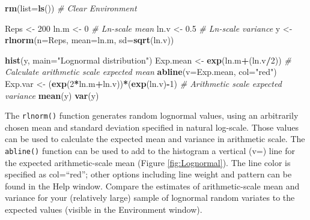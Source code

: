 \documentclass[
]{krantz}
\makeatletter
\newenvironment{Shaded}{\begin{snugshade}}{\end{snugshade}}
\newcommand{\AttributeTok}[1]{\textcolor[rgb]{0.27,0.27,0.27}{#1}}
\newcommand{\CommentTok}[1]{\textcolor[rgb]{0.37,0.37,0.37}{\textit{#1}}}
\newcommand{\DecValTok}[1]{\textcolor[rgb]{0.06,0.06,0.06}{#1}}
\newcommand{\FloatTok}[1]{\textcolor[rgb]{0.06,0.06,0.06}{#1}}
\newcommand{\FunctionTok}[1]{\textcolor[rgb]{0.27,0.27,0.27}{\textbf{#1}}}
\newcommand{\NormalTok}[1]{#1}
\newcommand{\OtherTok}[1]{\textcolor[rgb]{0.37,0.37,0.37}{#1}}
\newcommand{\SpecialCharTok}[1]{\textcolor[rgb]{0.43,0.43,0.43}{\textbf{#1}}}
\newcommand{\StringTok}[1]{\textcolor[rgb]{0.5,0.5,0.5}{#1}}
\newenvironment{kframe}{%
\medskip{}
\setlength{\fboxsep}{.8em}
 \def\at@end@of@kframe{}%
 \ifinner\ifhmode%
  \def\at@end@of@kframe{\end{minipage}}%
  \begin{minipage}{\columnwidth}%
 \fi\fi%
 \def\FrameCommand##1{\hskip\@totalleftmargin \hskip-\fboxsep
 \colorbox{shadecolor}{##1}\hskip-\fboxsep
     \hskip-\linewidth \hskip-\@totalleftmargin \hskip\columnwidth}%
 \MakeFramed {\advance\hsize-\width
   \@totalleftmargin\z@ \linewidth\hsize
   \@setminipage}}%
 {\par\unskip\endMakeFramed%
 \at@end@of@kframe}
\renewenvironment{Shaded}{\begin{kframe}}{\end{kframe}}
\makeatother
\begin{document}
\begin{Shaded}
\begin{Highlighting}[]
\FunctionTok{rm}\NormalTok{(}\AttributeTok{list=}\FunctionTok{ls}\NormalTok{()) }\CommentTok{\# Clear Environment}

\NormalTok{Reps }\OtherTok{\textless{}{-}} \DecValTok{200}
\NormalTok{ln.m }\OtherTok{\textless{}{-}} \DecValTok{0} \CommentTok{\# Ln{-}scale mean}
\NormalTok{ln.v }\OtherTok{\textless{}{-}} \FloatTok{0.5} \CommentTok{\# Ln{-}scale variance}
\NormalTok{y }\OtherTok{\textless{}{-}} \FunctionTok{rlnorm}\NormalTok{(}\AttributeTok{n=}\NormalTok{Reps, }\AttributeTok{mean=}\NormalTok{ln.m, }\AttributeTok{sd=}\FunctionTok{sqrt}\NormalTok{(ln.v))}

\FunctionTok{hist}\NormalTok{(y, }\AttributeTok{main=}\StringTok{"Lognormal distribution"}\NormalTok{)}
\NormalTok{Exp.mean }\OtherTok{\textless{}{-}} \FunctionTok{exp}\NormalTok{(ln.m}\SpecialCharTok{+}\NormalTok{(ln.v}\SpecialCharTok{/}\DecValTok{2}\NormalTok{)) }\CommentTok{\# Calculate arithmetic scale expected mean}
\FunctionTok{abline}\NormalTok{(}\AttributeTok{v=}\NormalTok{Exp.mean, }\AttributeTok{col=}\StringTok{"red"}\NormalTok{)}
\NormalTok{Exp.var }\OtherTok{\textless{}{-}}\NormalTok{ (}\FunctionTok{exp}\NormalTok{(}\DecValTok{2}\SpecialCharTok{*}\NormalTok{ln.m}\SpecialCharTok{+}\NormalTok{ln.v))}\SpecialCharTok{*}\NormalTok{(}\FunctionTok{exp}\NormalTok{(ln.v)}\SpecialCharTok{{-}}\DecValTok{1}\NormalTok{) }\CommentTok{\# Arithmetic scale expected variance}
\FunctionTok{mean}\NormalTok{(y)}
\FunctionTok{var}\NormalTok{(y)}
\end{Highlighting}
\end{Shaded}

The \texttt{rlnorm()} function generates random lognormal values, using an arbitrarily chosen mean and standard deviation specified in natural log-scale. Those values can be used to calculate the expected mean and variance in arithmetic scale. The \texttt{abline()} function can be used to add to the histogram a vertical (v=) line for the expected arithmetic-scale mean (Figure \ref{fig:Lognormal}). The line color is specified as col=``red''; other options including line weight and pattern can be found in the Help window. Compare the estimates of arithmetic-scale mean and variance for your (relatively large) sample of lognormal random variates to the expected values (visible in the Environment window).
\end{document}
